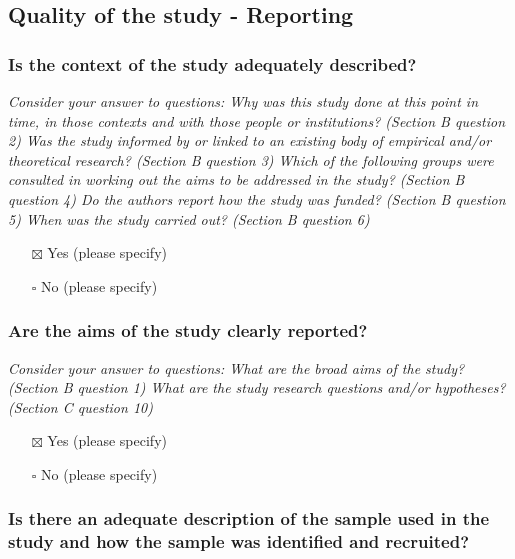 \documentclass[
  doc, a4paper]{apa7}
\providecommand{\tightlist}{%
  \setlength{\itemsep}{0pt}\setlength{\parskip}{0pt}}
\begin{document}
\subsection{Quality of the study - Reporting}\label{quality-of-the-study---reporting}

\subsubsection{Is the context of the study adequately described?}\label{is-the-context-of-the-study-adequately-described}

\emph{Consider your answer to questions: Why was this study done at this point in time, in those contexts and with those people or institutions? (Section B question 2) Was the study informed by or linked to an existing body of empirical and/or theoretical research? (Section B question 3) Which of the following groups were consulted in working out the aims to be addressed in the study? (Section B question 4) Do the authors report how the study was funded? (Section B question 5) When was the study carried out? (Section B question 6)}

\begin{itemize}
\tightlist
\item[$\boxtimes$]
  Yes (please specify)
\item[$\square$]
  No (please specify)
\end{itemize}

\subsubsection{Are the aims of the study clearly reported?}\label{are-the-aims-of-the-study-clearly-reported}

\emph{Consider your answer to questions: What are the broad aims of the study? (Section B question 1) What are the study research questions and/or hypotheses? (Section C question 10)}

\begin{itemize}
\tightlist
\item[$\boxtimes$]
  Yes (please specify)
\item[$\square$]
  No (please specify)
\end{itemize}

\subsubsection{Is there an adequate description of the sample used in the study and how the sample was identified and recruited?}\label{is-there-an-adequate-description-of-the-sample-used-in-the-study-and-how-the-sample-was-identified-and-recruited}
\end{document}
